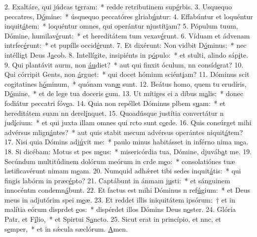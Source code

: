 2. Exaltáre, qui júdcas t\uline{e}rram:~* redde retributinem sup\uline{é}rbis.
3. Usquequo peccatres, D\uline{ó}mine:~* úsquequo peccatóres glriab\uline{ú}ntur:
4. Effabúntur et loquéntur inquit\uline{á}tem:~* loquéntur omnes, qui operántur njustít\uline{i}am?
5. Pópulum tuum, Dómine, humilav\uline{é}runt:~* et hereditátem tum vexav\uline{é}runt.
6. Víduam et ádvenam intrfec\uline{é}runt:~* et pupílls occid\uline{é}runt.
7. Et dixérunt: Non vidbit D\uline{ó}minus:~* nec intélligt Deus J\uline{a}cob.
8. Intellígite, insipiénts in p\uline{ó}pulo:~* et stulti, alindo sáp\uline{i}te.
9. Qui plantávit aurm, non \uline{áu}diet?~* aut qui finxit óculum, nn consíd\uline{e}rat?
10. Qui córripit Gents, non \uline{á}rguet:~* qui docet hóminm sciént\uline{i}am?
11. Dóminus scit cogitatines h\uline{ó}minum,~* quónam van\uline{æ} sunt.
12. Beátus homo, quem tu erudíris, D\uline{ó}mine,~* et de lege tua doceris \uline{e}um.
13. Ut mítiges ei a dibus m\uline{a}lis:~* donec fodiátur peccatri fóv\uline{e}a.
14. Quia non repéllet Dóminus plbem s\uline{u}am:~* et hereditátem suam nn derel\uline{í}nquet.
15. Quoadúsque justítia convertátur n jud\uline{í}cium:~* et qui juxta illam omnes qui rcto sunt c\uline{o}rde.
16. Quis consúrget mihi advérsus mlign\uline{á}ntes?~* aut quis stabit mecum advérsus operántes niquit\uline{á}tem?
17. Nisi quia Dómins adj\uline{ú}vit me:~* paulo minus habitásset in inférno nima m\uline{e}a.
18. Si dicébam: Motus st pes m\uline{e}us:~* misericórdia tua, Dómine, djuváb\uline{a}t me.
19. Secúndum multitúdinem dolórum meórum in crde m\uline{e}o:~* consolatiónes tuæ lætificavérunt nimam m\uline{e}am.
20. Numquid adhǽret tibi sedes inquit\uline{á}tis:~* qui fingis labórm in præc\uline{é}pto?
21. Captábunt in ánmam j\uline{u}sti:~* et sánguinem innocéntm condemn\uline{á}bunt.
22. Et factus est mihi Dóminus n ref\uline{ú}gium:~* et Deus meus in adjutórim spei m\uline{e}æ.
23. Et reddet illis iniquitátem ipsórum:~† et in malítia eórum disprdet \uline{e}os:~* dispérdet illos Dómins Deus n\uline{o}ster.
24. Glória Patr, et F\uline{í}lio,~* et Spirtui S\uline{a}ncto.
25. Sicut erat in princípio, et nnc, et s\uline{e}mper,~* et in sǽcula sæclórum. \uline{A}men.
